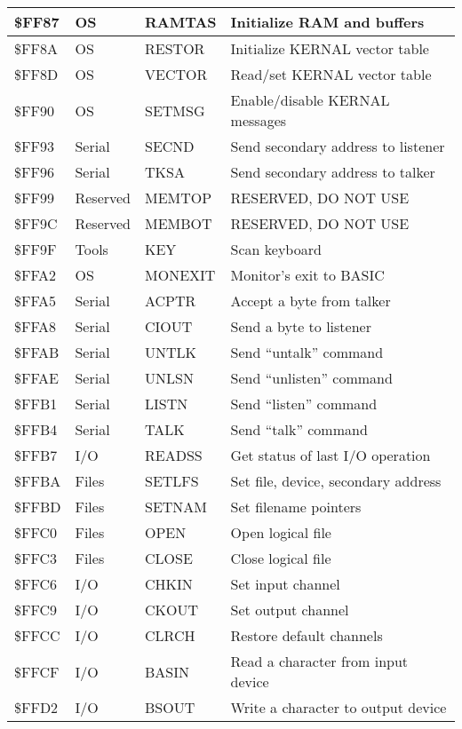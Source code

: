 \begin{longtable}{|L{2cm}|p{2cm}|p{2cm}|L{6cm}|}
\hline
\$FF87 & OS & RAMTAS & Initialize RAM and buffers \\
\hline
\$FF8A & OS & RESTOR & Initialize KERNAL vector table \\
\hline
\$FF8D & OS & VECTOR & Read/set KERNAL vector table \\
\hline
\$FF90 & OS & SETMSG & Enable/disable KERNAL messages \\
\hline
\$FF93 & Serial & SECND & Send secondary address to listener \\
\hline
\$FF96 & Serial & TKSA & Send secondary address to talker \\
\hline
\$FF99 & Reserved & MEMTOP & RESERVED, DO NOT USE \\
\hline
\$FF9C & Reserved & MEMBOT & RESERVED, DO NOT USE \\
\hline
\$FF9F & Tools & KEY & Scan keyboard \\
\hline
\$FFA2 & OS & MONEXIT & Monitor's exit to BASIC \\
\hline
\$FFA5 & Serial & ACPTR & Accept a byte from talker \\
\hline
\$FFA8 & Serial & CIOUT & Send a byte to listener \\
\hline
\$FFAB & Serial & UNTLK & Send ``untalk'' command \\
\hline
\$FFAE & Serial & UNLSN & Send ``unlisten'' command \\
\hline
\$FFB1 & Serial & LISTN & Send ``listen'' command \\
\hline
\$FFB4 & Serial & TALK & Send ``talk'' command \\
\hline
\$FFB7 & I/O & READSS & Get status of last I/O operation \\
\hline
\$FFBA & Files & SETLFS & Set file, device, secondary address \\
\hline
\$FFBD & Files & SETNAM & Set filename pointers \\
\hline
\$FFC0 & Files & OPEN & Open logical file \\
\hline
\$FFC3 & Files & CLOSE & Close logical file \\
\hline
\$FFC6 & I/O & CHKIN & Set input channel \\
\hline
\$FFC9 & I/O & CKOUT & Set output channel \\
\hline
\$FFCC & I/O & CLRCH & Restore default channels \\
\hline
\$FFCF & I/O & BASIN & Read a character from input device \\
\hline
\$FFD2 & I/O & BSOUT & Write a character to output device \\

\end{longtable}

